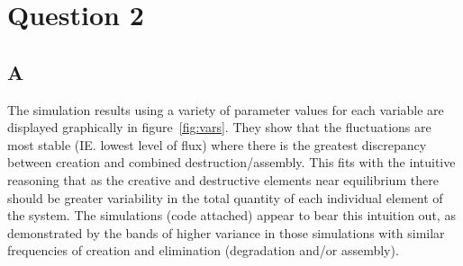 \documentclass[a4paper,12pt]{article}
\begin{document}
\section*{Question 2}

\subsection*{A}
The simulation results using a variety of parameter values for each variable are displayed graphically in figure~\ref{fig:vars}. They show that the fluctuations are most stable (IE. lowest level of flux) where there is the greatest discrepancy between creation and combined destruction/assembly. This fits with the intuitive reasoning that as the creative and destructive elements near equilibrium there should be greater variability in the total quantity of each individual element of the system. The simulations (code attached) appear to bear this intuition out, as demonstrated by the bands of higher variance in those simulations with similar frequencies of creation and elimination (degradation and/or assembly).
\end{document}

